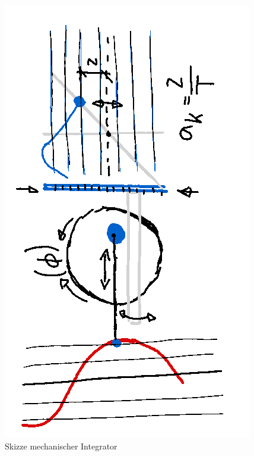 \begin{figure}
	\centering
	\includegraphics[width=\textwidth]{"papers/gezeiten/Skizze Integralmaschine"}
	\caption{Skizze mechanischer Integrator}
	\label{fig:skizze-integralmaschine}
\end{figure}
